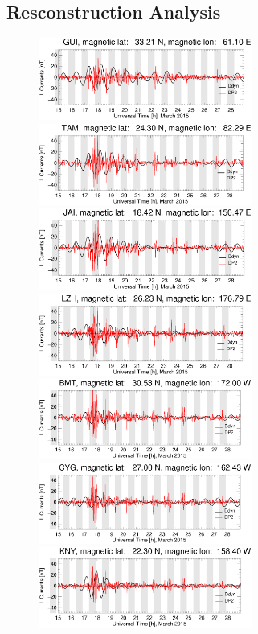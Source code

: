 \documentclass[a4paper]{article}
\theoremstyle{plain}
\theoremstyle{definition}
\begin{document}
	\subsection{Resconstruction Analysis}

\begin{figure}
	\centering
	\includegraphics[width=7.0cm]{fig/diono_recons/gui_2015-03-15_2015-03-28.eps}   
	\includegraphics[width=7.0cm]{fig/diono_recons/tam_2015-03-15_2015-03-28.eps} 
	\includegraphics[width=7.0cm]{fig/diono_recons/jai_2015-03-15_2015-03-28.eps}  
	\includegraphics[width=7.0cm]{fig/diono_recons/lzh_2015-03-15_2015-03-28.eps}
	\includegraphics[width=7.0cm]{fig/diono_recons/bmt_2015-03-15_2015-03-28.eps}
	\includegraphics[width=7.0cm]{fig/diono_recons/cyg_2015-03-15_2015-03-28.eps}		\includegraphics[width=7.0cm]{fig/diono_recons/kny_2015-03-15_2015-03-28.eps}  

\end{figure}
\end{document}
